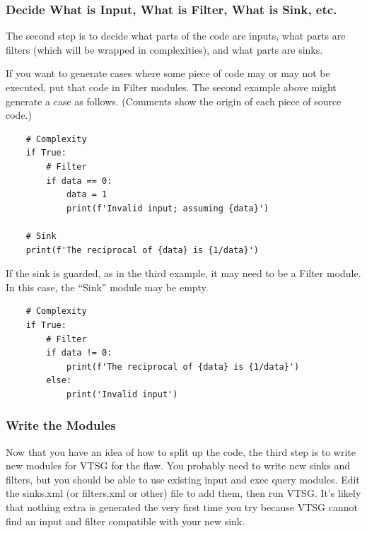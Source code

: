 \subsubsection{Decide What is Input, What is Filter, What is Sink, etc.}

The second step is to decide what parts of the code are inputs, what parts are
filters (which will be wrapped in complexities), and what parts are sinks.

If you want to generate cases where some piece of code may or may not be executed,
put that code in Filter modules.  The second example above might generate a case
as follows.  (Comments show the origin of each piece of source code.)
\begin{verbatim}
    # Complexity
    if True:
        # Filter
        if data == 0:
            data = 1
            print(f'Invalid input; assuming {data}')

    # Sink
    print(f'The reciprocal of {data} is {1/data}')
\end{verbatim}

If the sink is guarded, as in the third example, it may need to be a Filter module.
In this case, the ``Sink'' module may be empty.
\begin{verbatim}
    # Complexity
    if True:
        # Filter
        if data != 0:
            print(f'The reciprocal of {data} is {1/data}')
        else:
            print('Invalid input')
\end{verbatim}


\subsubsection{Write the Modules}

Now that you have an idea of how to split up the code, the third step is to
write new modules for VTSG for the flaw.  You probably need to write new sinks
and filters, but you should be able to use existing input and exec query
modules.  Edit the sinks.xml (or filters.xml or other) file to add them,
then run VTSG.  It's likely that nothing extra is generated the very first time you
try because VTSG cannot find an input and filter compatible with your new sink.


